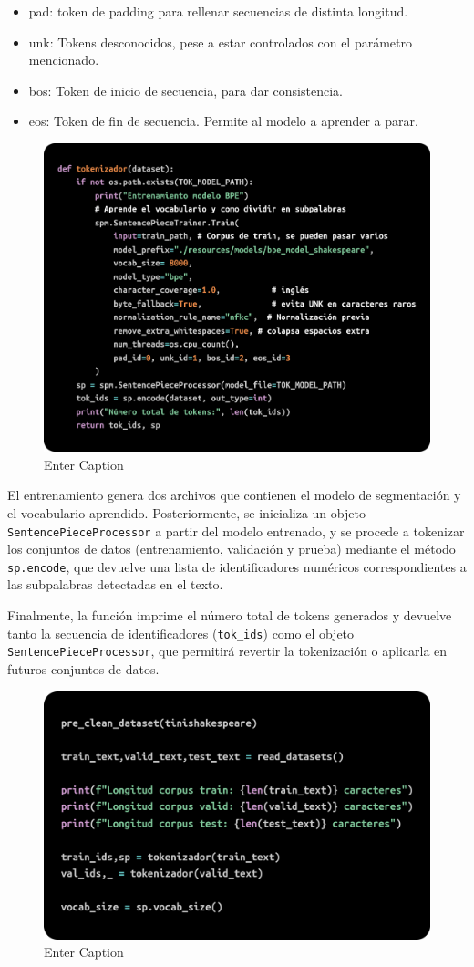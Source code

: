 \documentclass[11pt]{book}
\begin{document}
 \begin{itemize}
     \item pad: token de padding para rellenar secuencias de distinta longitud.
     \item unk: Tokens desconocidos, pese a estar controlados con el parámetro mencionado.
     \item bos: Token de inicio de secuencia, para dar consistencia.
     \item eos: Token de fin de secuencia. Permite al modelo a aprender a parar.
 \end{itemize}
 
\begin{figure}[h]
    \centering
    \includegraphics[width=0.5\linewidth]{img/sentence_trainer.png}
    \caption{Enter Caption}
    \label{fig:placeholder3}
\end{figure}
 

El entrenamiento genera dos archivos que contienen el modelo de segmentación y el vocabulario aprendido. Posteriormente, se inicializa un objeto \texttt{SentencePieceProcessor} a partir del modelo entrenado, y se procede a tokenizar los conjuntos de datos (entrenamiento, validación y prueba) mediante el método \texttt{sp.encode}, que devuelve una lista de identificadores numéricos correspondientes a las subpalabras detectadas en el texto. 

Finalmente, la función imprime el número total de tokens generados y devuelve tanto la secuencia de identificadores (\texttt{tok\_ids}) como el objeto \texttt{SentencePieceProcessor}, que permitirá revertir la tokenización o aplicarla en futuros conjuntos de datos.

\begin{figure}[h]
    \centering
    \includegraphics[width=0.5\linewidth]{img/limpieza_tokeniz_train.png}
    \caption{Enter Caption}
    \label{fig:placeholder30}
\end{figure}
\end{document}
